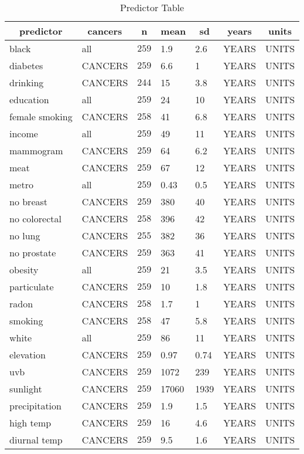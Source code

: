 %
\begin{table}[!tbp]
\caption{Predictor Table\label{tab:predictors}} 
\begin{center}
\begin{tabular}{llrllll}
\hline\hline
\multicolumn{1}{c}{predictor}&\multicolumn{1}{c}{cancers}&\multicolumn{1}{c}{n}&\multicolumn{1}{c}{mean}&\multicolumn{1}{c}{sd}&\multicolumn{1}{c}{years}&\multicolumn{1}{c}{units}\tabularnewline
\hline
black&all&$259$&1.9&2.6&YEARS&UNITS\tabularnewline
diabetes&CANCERS&$259$&6.6&1&YEARS&UNITS\tabularnewline
drinking&CANCERS&$244$&15&3.8&YEARS&UNITS\tabularnewline
education&all&$259$&24&10&YEARS&UNITS\tabularnewline
female smoking&CANCERS&$258$&41&6.8&YEARS&UNITS\tabularnewline
income&all&$259$&49&11&YEARS&UNITS\tabularnewline
mammogram&CANCERS&$259$&64&6.2&YEARS&UNITS\tabularnewline
meat&CANCERS&$259$&67&12&YEARS&UNITS\tabularnewline
metro&all&$259$&0.43&0.5&YEARS&UNITS\tabularnewline
no breast&CANCERS&$259$&380&40&YEARS&UNITS\tabularnewline
no colorectal&CANCERS&$258$&396&42&YEARS&UNITS\tabularnewline
no lung&CANCERS&$255$&382&36&YEARS&UNITS\tabularnewline
no prostate&CANCERS&$259$&363&41&YEARS&UNITS\tabularnewline
obesity&all&$259$&21&3.5&YEARS&UNITS\tabularnewline
particulate&CANCERS&$259$&10&1.8&YEARS&UNITS\tabularnewline
radon&CANCERS&$258$&1.7&1&YEARS&UNITS\tabularnewline
smoking&CANCERS&$258$&47&5.8&YEARS&UNITS\tabularnewline
white&all&$259$&86&11&YEARS&UNITS\tabularnewline
elevation&CANCERS&$259$&0.97&0.74&YEARS&UNITS\tabularnewline
uvb&CANCERS&$259$&1072&239&YEARS&UNITS\tabularnewline
sunlight&CANCERS&$259$&17060&1939&YEARS&UNITS\tabularnewline
precipitation&CANCERS&$259$&1.9&1.5&YEARS&UNITS\tabularnewline
high temp&CANCERS&$259$&16&4.6&YEARS&UNITS\tabularnewline
diurnal temp&CANCERS&$259$&9.5&1.6&YEARS&UNITS\tabularnewline
\hline
\end{tabular}
\end{center}
\end{table}

